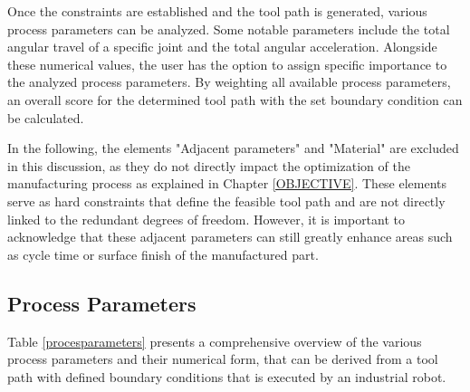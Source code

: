 Once the constraints are established and the tool path is generated, various process parameters can be analyzed. Some notable parameters include the total angular travel of a specific joint and the total angular acceleration. Alongside these numerical values, the user has the option to assign specific importance to the analyzed process parameters. By weighting all available process parameters, an overall score for the determined tool path with the set boundary condition can be calculated.


In the following, the elements "Adjacent parameters" and "Material" are excluded in this discussion, as they do not directly impact the optimization of the manufacturing process as explained in Chapter \ref{OBJECTIVE}. These elements serve as hard constraints that define the feasible tool path and are not directly linked to the redundant degrees of freedom. However, it is important to acknowledge that these adjacent parameters can still greatly enhance areas such as cycle time or surface finish of the manufactured part.



\subsection{Process Parameters}\label{pp}


Table \ref{procesparameters} presents a comprehensive overview of the various process parameters and their numerical form, that can be derived from a tool path with defined boundary conditions that is executed by an industrial robot. 


